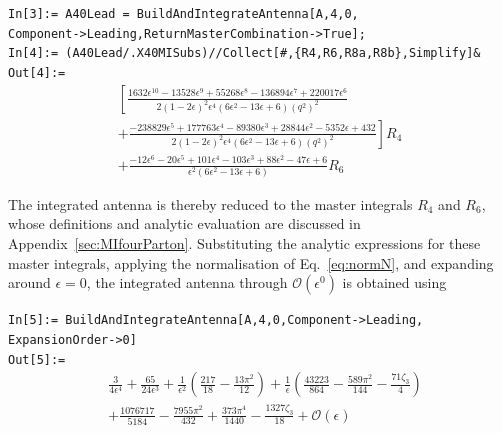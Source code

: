 \begin{mdframed}[backgroundcolor=gray!10, linewidth=0pt]
\texttt{In[3]:= A40Lead = BuildAndIntegrateAntenna[A,4,0,\\Component->Leading,ReturnMasterCombination->True];}\\
\texttt{In[4]:= (A40Lead/.X40MISubs)//Collect[\#,\{R4,R6,R8a,R8b\},Simplify]\&}\\
\hfill
\texttt{Out[4]:=}
    \begin{equation*}
        \begin{gathered}
            \left[\frac{1632\epsilon^{10}-13528\epsilon^9+55268\epsilon^8-136894\epsilon^7+220017\epsilon^6}{2(1-2\epsilon)^2\epsilon^4\left(6\epsilon^2-13\epsilon+6\right)\left(q^2\right)^2}\right.\\
            \left.+\frac{-238829\epsilon^5+177763\epsilon^4-89380\epsilon^3+28844\epsilon^2-5352\epsilon+432}{2(1-2\epsilon)^2\epsilon^4\left(6\epsilon^2-13\epsilon+6\right)\left(q^2\right)^2}\right]R_4\\
            +\frac{-12\epsilon^6-20\epsilon^5+101\epsilon^4-103\epsilon^3+88\epsilon^2-47\epsilon+6}{\epsilon^2\left(6\epsilon^2-13\epsilon+6\right)}R_6
        \end{gathered}
    \end{equation*}
\end{mdframed}

The integrated antenna is thereby reduced to the master integrals $R_4$ and $R_6$, whose
definitions and analytic evaluation are discussed in Appendix~\ref{sec:MIfourParton}.
Substituting the analytic expressions for these master integrals, applying the normalisation of
Eq.~\eqref{eq:normN}, and expanding around $\epsilon=0$, the integrated antenna through
$\mathcal O(\epsilon^0)$ is obtained using

\begin{mdframed}[backgroundcolor=gray!10, linewidth=0pt]
\texttt{In[5]:= BuildAndIntegrateAntenna[A,4,0,Component->Leading,\\ExpansionOrder->0]}\\
\hfill
\texttt{Out[5]:=}
    \begin{equation*}
        \begin{split}
            &\frac3{4\epsilon^4}+\frac{65}{24\epsilon^3}+\frac{1}{\epsilon^2}\!\left(\frac{217}{18}-\frac{13\pi^2}{12}\right)+\frac1\epsilon\!\left(\frac{43223}{864}-\frac{589\pi^2}{144}-\frac{71\zeta_3}{4}\right)\\
            &+\frac{1076717}{5184}-\frac{7955\pi^2}{432}+\frac{373\pi^4}{1440}-\frac{1327\zeta_3}{18}+\mathcal O(\epsilon)
        \end{split}
    \end{equation*}
\end{mdframed}

